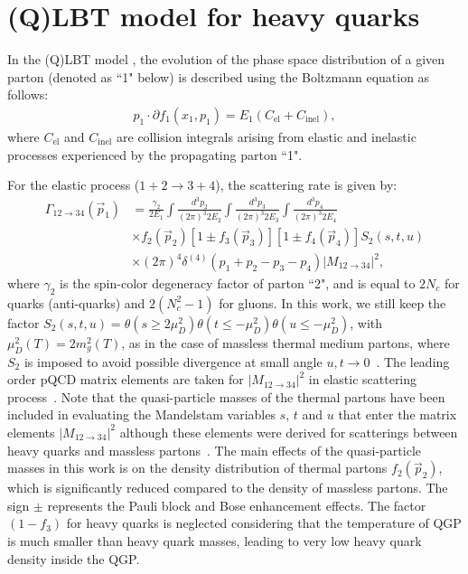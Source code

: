 \documentclass[aps,superscriptaddress,prc,twocolumn,nofootinbib]{revtex4}
\begin{document}
\section{(Q)LBT model for heavy quarks}
\label{sec:QLBT}

In the (Q)LBT model \cite{Wang:2013cia, He:2015pra, Cao:2016gvr, Cao:2017hhk, Xing:2019xae}, the evolution of the phase space distribution of a given parton (denoted as ``1" below) is described using the Boltzmann equation as follows:
\begin{align}
  \label{eq:boltzmann1}
  p_1\cdot\partial f_1(x_1,p_1)=E_1 (C_\mathrm{el} + C_\mathrm{inel}),
\end{align}
where $C_\mathrm{el}$ and $C_\mathrm{inel}$ are collision integrals arising from elastic and inelastic processes experienced by the propagating parton ``1".

For the elastic process ($1+2 \rightarrow 3+4$), the scattering rate is given by:
\begin{align}
\label{eq:gamma0}
\Gamma_{12 \to 34} (\vec{p}_1)
& = \frac{\gamma_2}{2E_1} \int \frac{d^3 p_2}{(2\pi)^3 2E_2} \int \frac{d^3 p_3}{(2\pi)^3 2E_3}\int \frac{d^3 p_4}{(2\pi)^3 2E_4}
\nonumber\\
& \times f_2(\vec{p}_2)[1\pm f_3(\vec{p}_3)] [1\pm f_4(\vec{p}_4)] S_2(s,t,u)
\nonumber\\
& \times (2\pi)^4 \delta^{(4)} (p_1 + p_2 - p_3 -p_4)|M_{12 \rightarrow 34}|^2,
\end{align}
where $\gamma_2$ is the spin-color degeneracy factor of parton ``2",  and is equal to $ 2 N_c$ for quarks (anti-quarks) and  $ 2 (N_c^2-1)$ for gluons.
In this work, we still keep the factor $S_2(s,t,u)=\theta(s\geq 2 \mu_D^2)\theta(t \leq-\mu_D^2)\theta(u \leq-\mu_D^2)$, with $\mu_D^2(T) = 2m_g^2(T)$, as in the case of massless thermal medium partons, where $S_2$ is imposed to avoid possible divergence at small angle $u, t \rightarrow 0$~\cite{Auvinen:2009qm, He:2015pra}. The leading order pQCD matrix elements are taken for $|M_{12 \rightarrow 34}|^2$ in elastic scattering process~\cite{Combridge:1978kx}. Note that the quasi-particle masses of the thermal partons have been included in evaluating the Mandelstam variables $s$, $t$ and $u$ that enter the matrix elements $|M_{12 \rightarrow 34}|^2$ although these elements were derived for scatterings between heavy quarks and massless partons~\cite{Combridge:1978kx}. The main effects of the quasi-particle masses in this work is on the density distribution of thermal partons $f_2(\vec{p}_2)$, which is significantly reduced compared to the density of massless partons. The sign $\pm$ represents the Pauli block and Bose enhancement effects.
The factor $(1-f_3)$ for heavy quarks is neglected considering that the temperature of QGP is much smaller than heavy quark masses, leading to very low heavy quark density inside the QGP.
\end{document}
